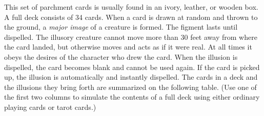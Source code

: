 This set of parchment cards is usually found in an ivory, leather, or wooden box. A full deck consists of 34 cards. When a card is drawn at random and thrown to the ground, a \textit{major image }of a creature is formed. The figment lasts until dispelled. The illusory creature cannot move more than 30 feet away from where the card landed, but otherwise moves and acts as if it were real. At all times it obeys the desires of the character who drew the card. When the illusion is dispelled, the card becomes blank and cannot be used again. If the card is picked up, the illusion is automatically and instantly dispelled. The cards in a deck and the illusions they bring forth are summarized on the following table. (Use one of the first two columns to simulate the contents of a full deck using either ordinary playing cards or tarot cards.)
\setlength{\tabcolsep}{1pt}
